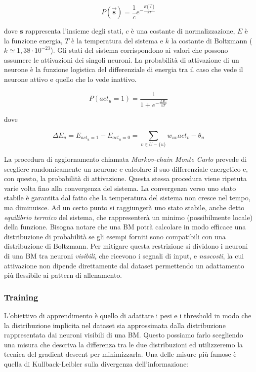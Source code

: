 \documentclass[10pt,a4paper]{article}
\begin{document}
$$
P(\mathbf{\overrightarrow{s}}) = \frac{1}{c} e^{-\frac{E(\mathbf{\overrightarrow{s}})}{kT}}
$$

dove $\mathbf{s}$ rappresenta l'insieme degli stati, $c$ è una costante di normalizzazione, $E$ è la funzione energia, $T$ è la temperatura del sistema e $k$ la costante di Boltzmann ($k \simeq 1,38 \cdot 10^{-23}$). Gli stati del sistema corrispondono ai valori che possono assumere le attivazioni dei singoli neuroni. La probabilità di attivazione di un neurone è la funzione logistica del differenziale di energia tra il caso che vede il neurone attivo e quello che lo vede inattivo.

$$
P(act_u = 1) = \frac{1}{1 + e^{-\frac{\Delta E_u}{kT}}}
$$

dove 

$$
\Delta E_u = E_{act_u = 1} - E_{act_u = 0} = \sum_{v \in U - \{u\}} w_{uv} act_v - \theta_u
$$
 
La procedura di aggiornamento chiamata \emph{Markov-chain Monte Carlo} prevede di scegliere randomicamente un neurone e calcolare il suo differenziale energetico e, con questo, la probabilità di attivazione. Questa stessa procedura  viene ripetuta varie volta fino alla convergenza del sistema. La convergenza verso uno stato stabile è garantita dal fatto che la temperatura del sistema non cresce nel tempo, ma diminuisce. Ad un certo punto si raggiungerà uno stato stabile, anche detto \emph{equilibrio termico} del sistema, che rappresenterà un minimo (possibilmente locale) della funzione.
Bisogna notare che una BM potrà calcolare in modo efficace una distribuzione di probabilità se gli esempi forniti sono compatibili con una distribuzione di Boltzmann. Per mitigare questa restrizione si dividono i neuroni di una BM tra neuroni \emph{visibili}, che ricevono i segnali di input, e \emph{nascosti}, la cui attivazione non dipende direttamente dal dataset permettendo un adattamento più flessibile ai pattern di allenamento. 

\subsubsection{Training}

L'obiettivo di apprendimento è quello di adattare i pesi e i threshold in modo che la distribuzione implicita nel dataset sia approssimata dalla distribuzione rappresentata dai neuroni visibili di una BM. Questo possiamo farlo scegliendo una misura che descriva la differenza tra le due distribuzioni ed utilizzeremo la tecnica del gradient descent per minimizzarla. Una delle misure più famose è quella di Kullback-Leibler sulla divergenza dell'informazione:
\end{document}
